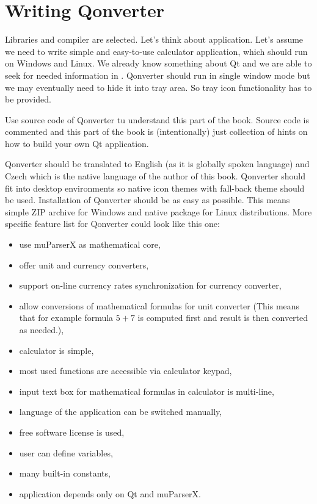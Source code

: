 \chapter{Writing Qonverter}
Libraries and compiler are selected. Let's think about application. Let's assume we need to write simple and easy-to-use calculator application, which should run on Windows and Linux. We already know something about Qt and we are able to seek for needed information in \citep{various:qtdoc}. Qonverter should run in single window mode but we may eventually need to hide it into tray area. So tray icon functionality has to be provided.

\begin{fdocextra}
Use source code of Qonverter tu understand this part of the book. Source code is commented and this part of the book is (intentionally) just collection of hints on how to build your own Qt application.
\end{fdocextra}

Qonverter should be translated to English (as it is globally spoken language) and Czech which is the native language of the author of this book. Qonverter should fit into desktop environments so native icon themes with fall-back theme should be used. Installation of Qonverter should be as easy as possible. This means simple ZIP archive for Windows and native package for Linux distributions. More specific feature list for Qonverter could look like this one:
\begin{itemize}
\item use muParserX as mathematical core,
\item offer unit and currency converters,
\item support on-line currency rates synchronization for currency converter,
\item allow conversions of mathematical formulas for unit converter (This means that for example formula $5+7$ is computed first and result is then converted as needed.),
\item calculator is simple,
\item most used functions are accessible via calculator keypad,
\item input text box for mathematical formulas in calculator is multi-line,
\item language of the application can be switched manually,
\item free software license is used,
\item user can define variables,
\item many built-in constants,
\item application depends only on Qt and muParserX.
\end{itemize}

